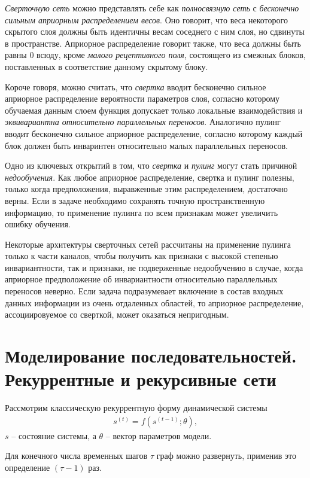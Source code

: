 \documentclass[%
	11pt,
	a4paper,
	utf8,
]{article}
\begin{document}
\emph{Сверточную сеть} можно представлять себе как \emph{полносвязную сеть} с \emph{бесконечно сильным априорным распределением весов}. Оно говорит, что веса некоторого скрытого слоя должны быть идентичны весам соседнего с ним слоя, но сдвинуты в пространстве. Априорное распределение говорит также, что веса должны быть равны 0 всюду, кроме \emph{малого рецептивного поля}, состоящего из смежных блоков, поставленных в соответствие данному скрытому блоку.

Короче говоря, можно считать, что \emph{свертка} вводит бесконечно сильное априорное распределение вероятности параметров слоя, согласно которому обучаемая данным слоем функция допускает только локальные взаимодействия и \emph{эквивариантна относительно параллельных переносов}. Аналогично пулинг вводит бесконечно сильное априорное распределение, согласно которому каждый блок должен быть инваринтен относительно малых параллельных переносов.

Одно из ключевых открытий в том, что \emph{свертка} и \emph{пулинг} могут стать причиной \emph{недообучения}. Как любое априорное распределение, свертка и пулинг полезны, только когда предположения, выравженные этим распределением, достаточно верны. Если в задаче необходимо сохранять точную пространственную информацию, то применение пулинга по всем признакам может увеличить ошибку обучения.

Некоторые архитектуры сверточных сетей рассчитаны на применение пулинга только к части каналов, чтобы получить как признаки с высокой степенью инвариантности, так и признаки, не подверженные недообучению в случае, когда априорное предположение об инвариантности относительно параллельных переносов неверно. Если задача подразумевает включение в состав входных данных информации из очень отдаленных областей, то априорное распределение, ассоциировуемое со сверткой, может оказаться непригодным.

\section{Моделирование последовательностей. Рекуррентные и рекурсивные сети}

Рассмотрим классическую рекуррентную форму динамической системы 
\begin{align*}
	s^{(t)} = f(s^{(t - 1)}; \theta),
\end{align*}
$ s $ -- состояние системы, а $ \theta $ -- вектор параметров модели.

Для конечного числа временных шагов $ \tau $ граф можно развернуть, применив это определение $ (\tau - 1) $ раз.
\end{document}
